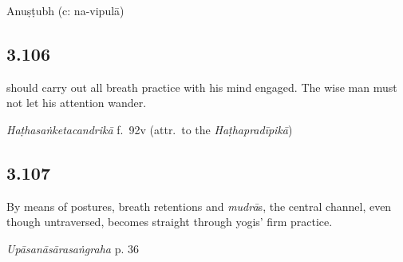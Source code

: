 \begin{ekdosis}
\begin{metre}[hp03_105]
Anuṣṭubh (c: na-vipulā)
\end{metre}

\subsection*{3.106}
\begin{translation} should carry out all breath practice with his mind engaged. The wise man must not let his attention wander.
\end{translation}


\begin{testimonia}[hp03_106]
\emph{Haṭhasaṅketacandrikā} f.~92v (attr.~to the \emph{Haṭhapradīpikā})
\begin{versinnote}
\end{versinnote}
\end{testimonia}



\subsection*{3.107}
\begin{translation}[hp03_107]
By means of postures, breath retentions and \emph{mudrā}s, the central channel, even though untraversed, becomes straight through yogis' firm practice.
\end{translation}
%


\begin{testimonia}[hp03_107]
\emph{Upāsanāsārasaṅgraha} p. 36 %
\begin{versinnote}
\end{versinnote}
\end{testimonia}


\end{ekdosis}
